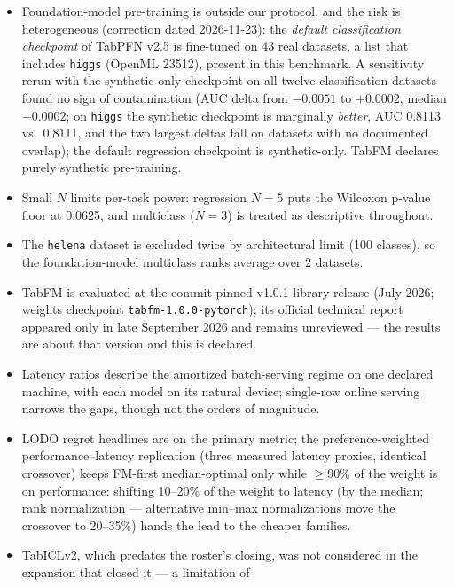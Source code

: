 \documentclass[11pt]{article}
\begin{document}
\begin{itemize}
  \item Foundation-model pre-training is outside our protocol, and the
    risk is heterogeneous (correction dated 2026-11-23): the
    \emph{default classification checkpoint} of TabPFN v2.5 is
    fine-tuned on 43 real datasets, a list that includes
    \texttt{higgs} (OpenML 23512), present in this benchmark. A
    sensitivity rerun with the synthetic-only checkpoint on all twelve
    classification datasets found no sign of contamination (AUC delta
    from $-0.0051$ to $+0.0002$, median $-0.0002$; on
    \texttt{higgs} the synthetic checkpoint is marginally
    \emph{better}, AUC 0.8113 vs.\ 0.8111, and the two largest
    deltas fall on datasets with no documented overlap); the default
    regression checkpoint is synthetic-only. TabFM declares purely synthetic
    pre-training.
  \item Small $N$ limits per-task power: regression $N{=}5$ puts the
    Wilcoxon p-value floor at 0.0625, and multiclass ($N{=}3$) is treated
    as descriptive throughout.
  \item The \texttt{helena} dataset is excluded twice by architectural
    limit (100 classes), so the foundation-model multiclass ranks average
    over 2 datasets.
  \item TabFM is evaluated at the commit-pinned v1.0.1 library release
  (July 2026; weights checkpoint \texttt{tabfm-1.0.0-pytorch}); its
    official technical report appeared only in late September 2026
    \citep{kong2026} and remains unreviewed --- the results are about
    that version and this is declared.
  \item Latency ratios describe the amortized batch-serving regime on one
    declared machine, with each model on its natural device; single-row
    online serving narrows the gaps, though not the orders of magnitude.
  \item LODO regret headlines are on the primary metric; the
    preference-weighted performance--latency replication (three measured
    latency proxies, identical crossover) keeps FM-first
    median-optimal only while ${\geq}90\%$ of the weight is on
    performance: shifting 10--20\% of the weight to latency (by the
    median; rank normalization --- alternative min--max
    normalizations move the crossover to 20--35\%) hands the lead to
    the cheaper families.
  \item TabICLv2, which predates the roster's closing, was not
    considered in the expansion that closed it --- a limitation of

\end{itemize}
\end{document}
